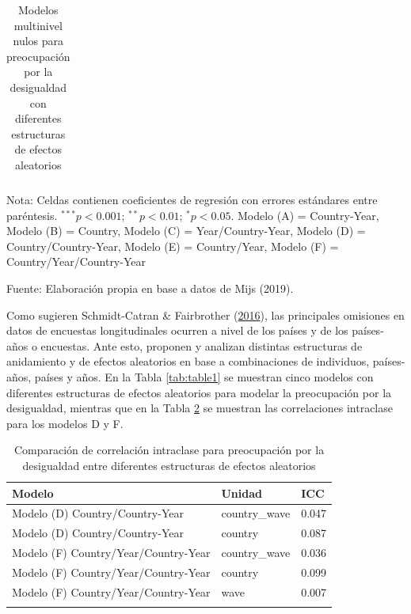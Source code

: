 \documentclass[
  12pt,
  a4paper,
]{article}
\begin{document}
\begin{table}[h!]
\begin{center}
{\begin{threeparttable}
\begin{tabular}{l c c c c c c}
\bottomrule
\end{tabular}
\begin{tablenotes}[flushleft]
\scriptsize{\item Nota: Celdas contienen coeficientes de regresión con errores estándares entre paréntesis. $^{***}p<0.001$; $^{**}p<0.01$; $^{*}p<0.05$. Modelo (A) = Country-Year, Modelo (B) = Country, Modelo (C) = Year/Country-Year, Modelo (D) = Country/Country-Year, Modelo (E) = Country/Year, Modelo (F) = Country/Year/Country-Year \\ \item Fuente: Elaboración propia en base a datos de Mijs (2019).}
\end{tablenotes}
\end{threeparttable}
}
\caption{\label{tab:table1} Modelos multinivel nulos para preocupación por la desigualdad con diferentes estructuras de efectos aleatorios}
\label{table:coefficients}
\end{center}
\end{table}

Como sugieren Schmidt-Catran \& Fairbrother (\protect\hyperlink{ref-schmidt-catranRandomEffectsMultilevel2016}{2016}), las principales omisiones en datos de encuestas longitudinales ocurren a nivel de los países y de los países-años o encuestas. Ante esto, proponen y analizan distintas estructuras de anidamiento y de efectos aleatorios en base a combinaciones de individuos, países-años, países y años. En la Tabla \ref{tab:table1} se muestran cinco modelos con diferentes estructuras de efectos aleatorios para modelar la preocupación por la desigualdad, mientras que en la Tabla \ref{tab:table2} se muestran las correlaciones intraclase para los modelos D y F.

\begin{table}[!h]

\caption{\label{tab:table2}\label{tab:table2} Comparación de correlación intraclase para preocupación por la desigualdad entre diferentes estructuras de efectos aleatorios}
\centering
\begin{tabular}[t]{>{\raggedright\arraybackslash}p{8cm}ll}
\toprule
\textbf{Modelo} & \textbf{Unidad} & \textbf{ICC}\\
\midrule
Modelo (D) Country/Country-Year & country\_wave & 0.047\\
Modelo (D) Country/Country-Year & country & 0.087\\
Modelo (F) Country/Year/Country-Year & country\_wave & 0.036\\
Modelo (F) Country/Year/Country-Year & country & 0.099\\
Modelo (F) Country/Year/Country-Year & wave & 0.007\\
\bottomrule
\multicolumn{3}{l}{\textsuperscript{} Fuente: Elaboración propia en base a datos de Mijs (2019).}\\
\end{tabular}
\end{table}
\end{document}
